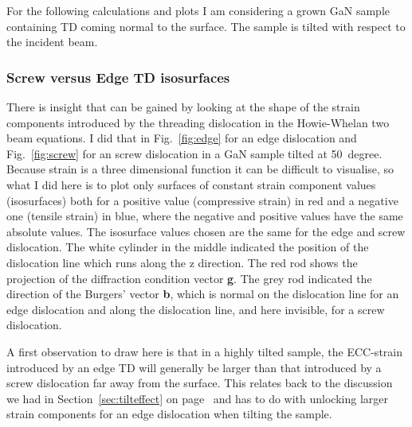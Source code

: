 For the following calculations and plots I am considering a \hkl[001] grown GaN sample containing TD coming normal to the surface. The sample is tilted with respect to the incident beam.


\subsubsection{Screw versus Edge TD isosurfaces}

There is insight that can be gained by looking at the shape of the strain components introduced by the threading dislocation in the Howie-Whelan two beam equations. I did that in Fig.~\ref{fig:edge} for an edge dislocation and   Fig.~\ref{fig:screw} for an screw dislocation in a GaN sample tilted at \SI{50}{degree}. Because strain is a three dimensional function it can be difficult to visualise, so what I did here is to plot only surfaces of constant strain component values (isosurfaces) both for a positive value (compressive strain) in red and a negative one (tensile strain) in blue, where the negative and positive values have the same absolute values. The isosurface values chosen are the same for the edge and screw dislocation.  The white cylinder in the middle indicated the position of the dislocation line which runs along the z direction. The red rod shows the projection of the diffraction condition vector \textbf{g}. The grey rod indicated the direction of the Burgers' vector \textbf{b}, which is normal on the dislocation line for an edge dislocation and along the dislocation line, and here invisible, for a screw dislocation. 


A first observation to draw here is that in a highly tilted sample, the ECC-strain introduced by an edge TD will generally be larger than that introduced by a screw dislocation far away from the surface. This relates back to the discussion we had in Section~\ref{sec:tilteffect} on page~\pageref{sec:tilteffect} and has to do with unlocking larger strain components for an edge dislocation when tilting the sample. 



